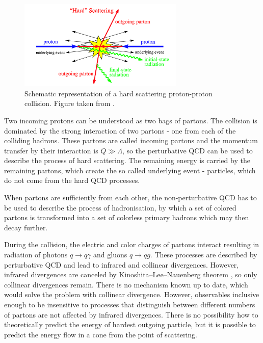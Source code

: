\begin{figure}[t]
  \centering
  \includegraphics[width=0.7\textwidth]{Chapter2/HardProcess.png}
  \caption{Schematic representation of a hard scattering proton-proton
    collision. Figure taken from \cite{HardProcess}.}
  \label{fig:HardProcess}
\end{figure}

Two incoming protons can be understood as two bags of partons. The collision is
dominated by the strong interaction of two partons - one from each of the
colliding hadrons. These partons are called incoming partons and the
momentum transfer by their interaction is $Q \gg \Lambda$, so the perturbative
QCD can be used to describe the process of hard scattering. The remaining energy
is carried by the remaining partons, which create the so called underlying event -
particles, which do not come from the hard QCD processes.

When partons are sufficiently from each other, the non-perturbative QCD has to
be used to describe the process of hadronisation, by which a set of colored
partons is transformed into a set of colorless primary hadrons which may then
decay further. 

During the collision, the electric and color charges of partons interact
resulting in radiation of photons $q \rightarrow q\gamma$ and gluons $q
\rightarrow qg$. These processes are described by perturbative QCD and lead to
infrared and collinear divergences. However, infrared divergences are
canceled by Kinoshita--Lee--Nauenberg theorem \cite{KLN1,KLN2}, so only
collinear divergences remain. There is no mechanism known up to date, which
would solve the problem with collinear divergence. However, observables
inclusive enough to be insensitive to processes that distinguish between
different numbers of partons are not affected by infrared divergences.
There is no possibility how to theoretically predict the energy of hardest
outgoing particle, but it is possible to predict the energy flow in a cone from
the point of scattering.


